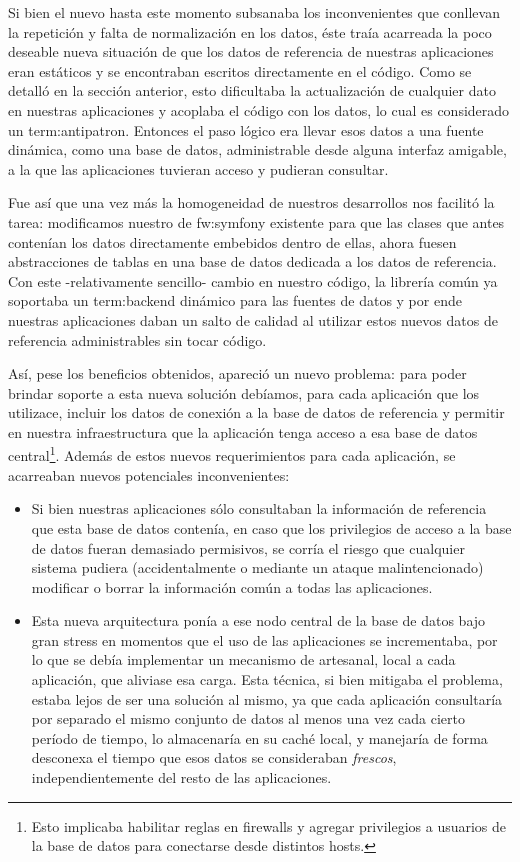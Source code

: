 Si bien el nuevo  hasta este momento subsanaba los inconvenientes que conllevan la repetición y falta de normalización en los datos, éste traía acarreada  la poco deseable nueva situación de que los datos de referencia de nuestras aplicaciones eran estáticos y se encontraban escritos directamente en el código. Como se detalló en la sección anterior, esto dificultaba la actualización de cualquier dato en nuestras aplicaciones y  acoplaba el código con los datos, lo cual es considerado un \gls{term:antipatron}. Entonces el paso lógico era llevar esos datos a una fuente dinámica, como una base de datos, administrable desde alguna interfaz amigable, a la que las aplicaciones tuvieran acceso y pudieran consultar.

Fue así que una vez más la homogeneidad de nuestros desarrollos nos facilitó la tarea: modificamos nuestro  de \gls{fw:symfony} existente para que las clases que antes contenían los datos directamente embebidos dentro de ellas, ahora fuesen abstracciones de tablas en una base de datos dedicada a los datos de referencia. Con este -relativamente sencillo- cambio en nuestro código, la librería común ya soportaba un \gls{term:backend} dinámico para las fuentes de datos y por ende nuestras aplicaciones daban un salto de calidad al utilizar estos nuevos datos de referencia administrables sin tocar código.

Así, pese los beneficios obtenidos, apareció un nuevo problema: para poder brindar soporte a esta nueva solución debíamos, para cada aplicación que los utilizace, incluir los datos de conexión a la base de datos de referencia y permitir en nuestra infraestructura que la aplicación tenga acceso a esa base de datos central\footnote{Esto implicaba habilitar reglas en firewalls y agregar privilegios a usuarios de la base de datos para conectarse desde distintos hosts.}. Además de estos nuevos requerimientos para cada aplicación, se acarreaban nuevos potenciales inconvenientes:

\begin{itemize}
  \item Si bien nuestras aplicaciones sólo consultaban la información de referencia que esta base de datos contenía, en caso que los privilegios de acceso a la base de datos fueran demasiado permisivos, se corría el riesgo que cualquier sistema pudiera (accidentalmente o mediante un ataque malintencionado) modificar o borrar la información común a todas las aplicaciones.

  \item Esta nueva arquitectura ponía a ese nodo central de la base de datos bajo gran stress en momentos que el uso de las aplicaciones se incrementaba, por lo que se debía implementar un mecanismo de  artesanal, local a cada aplicación, que aliviase esa carga. Esta técnica, si bien mitigaba el problema, estaba lejos de ser una solución al mismo, ya que cada aplicación consultaría por separado el mismo conjunto de datos al menos una vez cada cierto período de tiempo, lo almacenaría en su caché local, y manejaría de forma desconexa el tiempo que esos datos se consideraban \textit{frescos}, independientemente del resto de las aplicaciones.
\end{itemize}

